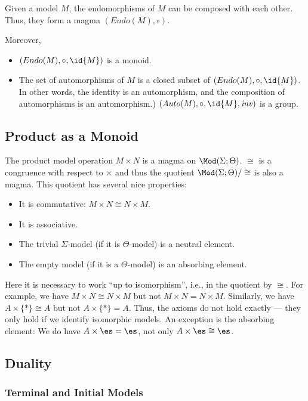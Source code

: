 Given a model $M$, the endomorphisms of $M$ can be composed with each other.
Thus, they form a magma $(Endo(M),\circ)$.

Moreover,
\begin{itemize}
\item $(Endo(M),\circ, \id{M})$ is a monoid.
\item The set of automorphisms of $M$ is a closed subset of $(Endo(M),\circ, \id{M})$.
In other words, the identity is an automorphism, and the composition of automorphisms is an automorphism.)
$(Auto(M),\circ, \id{M},\inv)$ is a group.
\end{itemize}

\subsection{Product as a Monoid}

The product model operation $M\times N$ is a magma on $\Mod(\Sigma;\Theta)$.
$\cong$ is a congruence with respect to $\times$ and thus the quotient $\Mod(\Sigma;\Theta)/\cong$ is also a magma.
This quotient has several nice properties:
\begin{itemize}
 \item It is commutative: $M\times N\cong N\times M$.
 \item It is associative.
 \item The trivial $\Sigma$-model (if it is $\Theta$-model) is a neutral element.
 \item The empty model (if it is a $\Theta$-model) is an absorbing element.
\end{itemize}

Here it is necessary to work ``up to isomorphism'', i.e., in the quotient by $\cong$.
For example, we have $M\times N \cong N\times M$ but not $M\times N=N\times M$.
Similarly, we have $A\times \{\ast\}\cong A$ but not $A\times \{\ast\}=A$.
Thus, the axioms do not hold exactly --- they only hold if we identify isomorphic models.
An exception is the absorbing element: We do have $A\times \es=\es$, not only $A\times \es\cong \es$.

\subsection{Duality}\label{sec:univ:meta:dual}

\subsubsection{Terminal and Initial Models}\label{sec:univ:meta:terminit}


